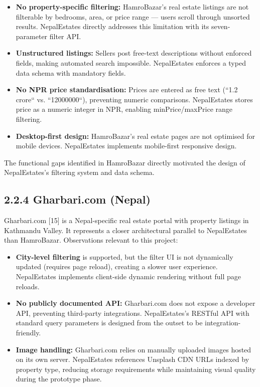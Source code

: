 \documentclass[12pt,a4paper]{report}
\begin{document}
\begin{itemize}
  \item \textbullet{} \textbf{No property-specific filtering:} HamroBazar's real estate listings are not filterable by bedrooms, area, or price range --- users scroll through unsorted results. NepalEstates directly addresses this limitation with its seven-parameter filter API.
  \item \textbullet{} \textbf{Unstructured listings:} Sellers post free-text descriptions without enforced fields, making automated search impossible. NepalEstates enforces a typed data schema with mandatory fields.
  \item \textbullet{} \textbf{No NPR price standardisation:} Prices are entered as free text (``1.2 crore`` vs. ``12000000``), preventing numeric comparisons. NepalEstates stores price as a numeric integer in NPR, enabling minPrice/maxPrice range filtering.
  \item \textbullet{} \textbf{Desktop-first design:} HamroBazar's real estate pages are not optimised for mobile devices. NepalEstates implements mobile-first responsive design.
\end{itemize}
The functional gaps identified in HamroBazar directly motivated the design of NepalEstates's filtering system and data schema.

\subsection{2.2.4 Gharbari.com (Nepal)}
Gharbari.com [15] is a Nepal-specific real estate portal with property listings in Kathmandu Valley. It represents a closer architectural parallel to NepalEstates than HamroBazar. Observations relevant to this project:

\begin{itemize}
  \item \textbullet{} \textbf{City-level filtering} is supported, but the filter UI is not dynamically updated (requires page reload), creating a slower user experience. NepalEstates implements client-side dynamic rendering without full page reloads.
  \item \textbullet{} \textbf{No publicly documented API:} Gharbari.com does not expose a developer API, preventing third-party integrations. NepalEstates's RESTful API with standard query parameters is designed from the outset to be integration-friendly.
  \item \textbullet{} \textbf{Image handling:} Gharbari.com relies on manually uploaded images hosted on its own server. NepalEstates references Unsplash CDN URLs indexed by property type, reducing storage requirements while maintaining visual quality during the prototype phase.
\end{itemize}
\end{document}
